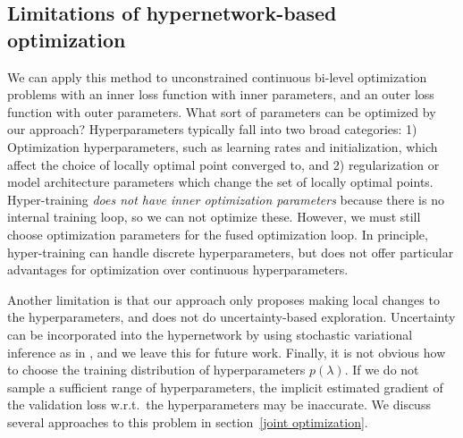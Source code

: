 \documentclass{article} %
\newcommand{\hyper}{\lambda} %
\begin{document}
\subsection{Limitations of hypernetwork-based optimization}
We can apply this method to unconstrained continuous bi-level optimization problems with an inner loss function with inner parameters, and an outer loss function with outer parameters.
What sort of parameters can be optimized by our approach?
Hyperparameters typically fall into two broad categories:
1) Optimization hyperparameters, such as learning rates and initialization, which affect the choice of locally optimal point converged to, and
2) regularization or model architecture parameters which change the set of locally optimal points.
Hyper-training \emph{does not have inner optimization parameters} because there is no internal training loop, so we can not optimize these.
However, we must still choose optimization parameters for the fused optimization loop.
In principle, hyper-training can handle discrete hyperparameters, but does not offer particular advantages for optimization over continuous hyperparameters.

Another limitation is that our approach only proposes making local changes to the hyperparameters, and does not do uncertainty-based exploration.
Uncertainty can be incorporated into the hypernetwork by using stochastic variational inference as in \citet{blundell2015weight}, and we leave this for future work.
Finally, it is not obvious how to choose the training distribution of hyperparameters $p(\hyper)$.
If we do not sample a sufficient range of hyperparameters, the implicit estimated gradient of the validation loss w.r.t.\ the hyperparameters may be inaccurate.
We discuss several approaches to this problem in section~\ref{joint optimization}.
\end{document}
